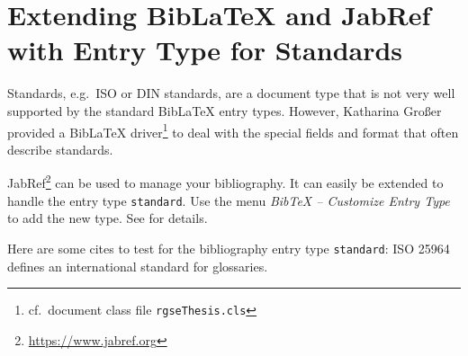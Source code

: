 
\chapter{Extending BibLaTeX and JabRef with Entry Type for Standards}

Standards, e.g.\ ISO or DIN standards, are a document type that is not very well supported by the standard BibLaTeX entry types. However, Katharina Großer provided a BibLaTeX driver\footnote{cf.\ document class file \texttt{rgseThesis.cls}} to deal with the special fields and format that often describe standards.

JabRef\footnote{\url{https://www.jabref.org}} can be used to manage your bibliography. It can easily be extended to handle the entry type \texttt{standard}. Use the menu \emph{BibTeX -- Customize Entry Type} to add the new type. See  for details.



Here are some cites to test for the bibliography entry type \texttt{standard}: ISO 25964 \cite{ISO20111TI, ISO20132IO} defines an international standard for glossaries.

\cleardoublepage
